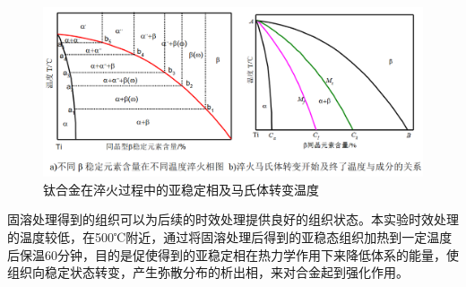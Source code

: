 \begin{figure}[h!]
	\centering
	\includegraphics[width=0.7\linewidth]{pic/tc4change}
	\caption{钛合金在淬火过程中的亚稳定相及马氏体转变温度}
	\label{fig:tc4change}
\end{figure}

固溶处理得到的组织可以为后续的时效处理提供良好的组织状态。本实验时效处理的温度较低，在500℃附近，通过将固溶处理后得到的亚稳态组织加热到一定温度后保温60分钟，目的是促使得到的亚稳定相在热力学作用下来降低体系的能量，使组织向稳定状态转变，产生弥散分布的析出相，来对合金起到强化作用。


